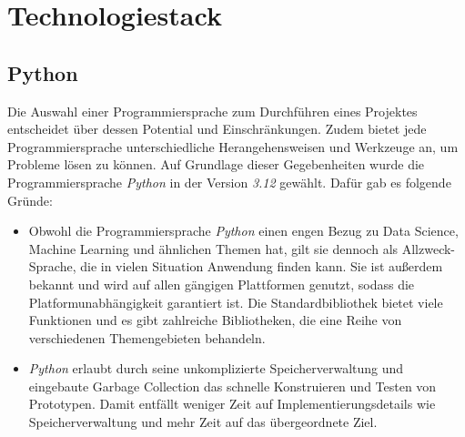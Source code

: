 \section{Technologiestack}\label{sec:entscheidungen}

\subsection{Python}

Die Auswahl einer Programmiersprache zum Durchführen eines Projektes entscheidet über dessen Potential und Einschränkungen.
Zudem bietet jede Programmiersprache unterschiedliche Herangehensweisen und Werkzeuge an, um Probleme lösen zu können.
Auf Grundlage dieser Gegebenheiten wurde die Programmiersprache \textit{Python} in der Version \textit{3.12} gewählt.
Dafür gab es folgende Gründe:

\begin{itemize}
    \item Obwohl die Programmiersprache \textit{Python} einen engen Bezug zu Data Science, Machine Learning und ähnlichen Themen hat, gilt sie dennoch als Allzweck-Sprache,
    die in vielen Situation Anwendung finden kann. Sie ist außerdem bekannt und wird auf allen gängigen Plattformen genutzt, sodass die Platformunabhängigkeit garantiert ist. 
    Die Standardbibliothek bietet viele Funktionen und es gibt zahlreiche Bibliotheken, die eine Reihe von verschiedenen Themengebieten behandeln.
    \item \textit{Python} erlaubt durch seine unkomplizierte Speicherverwaltung und eingebaute Garbage Collection das schnelle Konstruieren und Testen von Prototypen.
    Damit entfällt weniger Zeit auf Implementierungsdetails wie Speicherverwaltung und mehr Zeit auf das übergeordnete Ziel.
\end{itemize}





